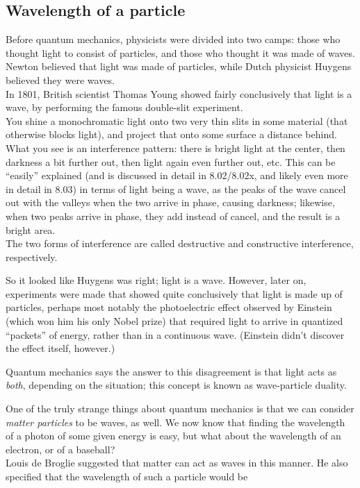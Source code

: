 \subsection{Wavelength of a particle}

Before quantum mechanics, physicists were divided into two camps: those who thought light to consist of particles, and those who thought it was made of waves.\\
Newton believed that light was made of particles, while Dutch physicist Huygens believed they were waves.\\
In 1801, British scientist Thomas Young showed fairly conclusively that light is a wave, by performing the famous double-slit experiment.\\
You shine a monochromatic light onto two very thin slits in some material (that otherwise blocks light), and project that onto some surface a distance behind.\\
What you see is an interference pattern: there is bright light at the center, then darkness a bit further out, then light again even further out, etc. This can be ``easily'' explained (and is discussed in detail in 8.02/8.02x, and likely even more in detail in 8.03) in terms of light being a wave, as the peaks of the wave cancel out with the valleys when the two arrive in phase, causing darkness; likewise, when two peaks arrive in phase, they add instead of cancel, and the result is a bright area.\\
The two forms of interference are called destructive and constructive interference, respectively.

So it looked like Huygens was right; light is a wave. However, later on, experiments were made that showed quite conclusively that light is made up of particles, perhaps most notably the photoelectric effect observed by Einstein (which won him his only Nobel prize) that required light to arrive in quantized ``packets'' of energy, rather than in a continuous wave. (Einstein didn't discover the effect itself, however.)

Quantum mechanics says the answer to this disagreement is that light acts as \emph{both}, depending on the situation; this concept is known as wave-particle duality.

One of the truly strange things about quantum mechanics is that we can consider \emph{matter particles} to be waves, as well. We now know that finding the wavelength of a photon of some given energy is easy, but what about the wavelength of an electron, or of a baseball?\\
Louis de Broglie suggested that matter can act as waves in this manner. He also specified that the wavelength of such a particle would be

